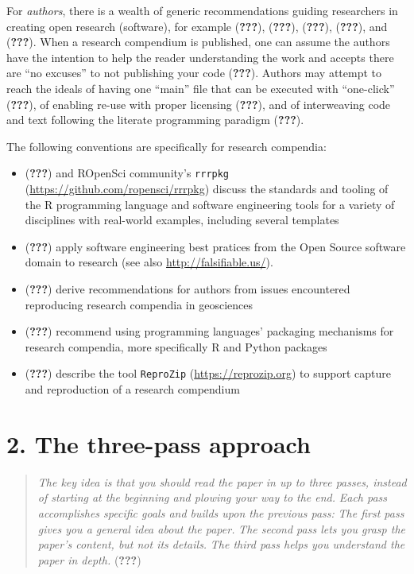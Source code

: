 \documentclass[twocolumn]{article}
\providecommand{\tightlist}{%
  \setlength{\itemsep}{0pt}\setlength{\parskip}{0pt}}
\begin{document}
For \emph{authors}, there is a wealth of generic recommendations guiding
researchers in creating open research (software), for example
({\textbf{???}}), ({\textbf{???}}), ({\textbf{???}}), ({\textbf{???}}),
and ({\textbf{???}}). When a research compendium is published, one can
assume the authors have the intention to help the reader understanding
the work and accepts there are ``no excuses'' to not publishing your
code ({\textbf{???}}). Authors may attempt to reach the ideals of having
one ``main'' file that can be executed with ``one-click''
({\textbf{???}}), of enabling re-use with proper licensing
({\textbf{???}}), and of interweaving code and text following the
literate programming paradigm ({\textbf{???}}).

The following conventions are specifically for research compendia:

\begin{itemize}
\tightlist
\item
  ({\textbf{???}}) and ROpenSci community's \texttt{rrrpkg}
  (\url{https://github.com/ropensci/rrrpkg}) discuss the standards and
  tooling of the R programming language and software engineering tools
  for a variety of disciplines with real-world examples, including
  several templates
\item
  ({\textbf{???}}) apply software engineering best pratices from the
  Open Source software domain to research (see also
  \url{http://falsifiable.us/}).
\item
  ({\textbf{???}}) derive recommendations for authors from issues
  encountered reproducing research compendia in geosciences
\item
  ({\textbf{???}}) recommend using programming languages' packaging
  mechanisms for research compendia, more specifically R and Python
  packages
\item
  ({\textbf{???}}) describe the tool \texttt{ReproZip}
  (\url{https://reprozip.org}) to support capture and reproduction of a
  research compendium
\end{itemize}

\hypertarget{the-three-pass-approach}{%
\section*{2. The three-pass approach}\label{the-three-pass-approach}}

\begin{quote}
\emph{The key idea is that you should read the paper in up to three
passes, instead of starting at the beginning and plowing your way to the
end.} \emph{Each pass accomplishes specific goals and builds upon the
previous pass:} \emph{The first pass gives you a general idea about the
paper.} \emph{The second pass lets you grasp the paper's content, but
not its details.} \emph{The third pass helps you understand the paper in
depth.} ({\textbf{???}})
\end{quote}
\end{document}
